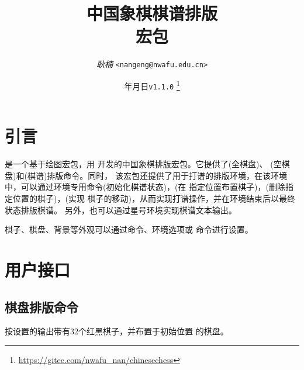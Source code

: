 \documentclass[full]{l3doc}
\def\vers{\texttt{v1.1.0} }
\begin{document}
\title{
  中国象棋棋谱排版\\ 宏包
}
\author{\textit{耿楠} \texttt{<nangeng@nwafu.edu.cn>}}
\date{\the\year 年\the\month 月\the\day 日\qquad \vers
\thanks{\url{https://gitee.com/nwafu_nan/chinesechess}}
}
\maketitle

{\small
\tableofcontents
}
\newpage

\begin{documentation}

\section{引言}

是一个基于绘图宏包，用%
开发的中国象棋排版宏包。它提供了(全棋盘)、%
(空棋盘)和(棋谱)排版命令。同时，
该宏包还提供了用于打谱的排版环境，在该环境
中，可以通过环境专用命令(初始化棋谱状态)，(在
指定位置布置棋子)，(删除指定位置的棋子)，(实现
棋子的移动)，从而实现打谱操作，并在环境结束后以最终状态排版棋谱。
另外，也可以通过星号环境实现棋谱文本输出。

棋子、棋盘、背景等外观可以通过命令、环境选项或%
命令进行设置。

\section{用户接口}

\subsection{棋盘排版命令}

\begin{function}{\cchessboard}
  \begin{syntax}
     
     
  \end{syntax}
\end{function}

  按设置的输出带有32个红黑棋子，并布置于初始位置
  的棋盘。


\end{documentation}
\end{document}
